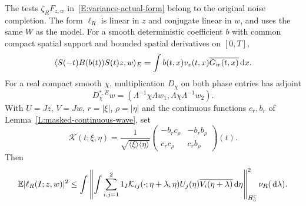 \begin{proposition}\label{P:actual-wave-form}
  The tests $\zeta_RF_{z,w}$ in~\eqref{E:variance-actual-form} belong to the
  original noise completion. The form $\ell_R$ is linear in $z$ and conjugate
  linear in $w$, and uses the same $W$ as the model. For a smooth deterministic
  coefficient $b$ with common compact spatial support and bounded spatial
  derivatives on $[0,T]$,
  \begin{equation}\label{E:variance-physical-adjoint}
    \langle S(-t)B(b(t))S(t)z,w\rangle_E
    = \int b(t,x)v_z(t,x)\overline{G_w(t,x)}\,\mathrm{d} x.
  \end{equation}
  For a real compact smooth $\chi$, multiplication $D_\chi$ on both phase
  entries has adjoint
  \begin{equation}\label{E:variance-cutoff-adjoint}
    D_\chi^{*,E}w
    = \left(\Lambda^{-1}\chi\Lambda w_1,
    \Lambda\chi\Lambda^{-1}w_2\right).
  \end{equation}
  With $U = Jz$, $V = Jw$, $r = |\xi|$, $\rho = |\eta|$ and the continuous
  functions $c_r,b_r$ of Lemma~\ref{L:masked-continuous-wave}, set
  \begin{equation}\label{E:variance-normalized-kernel}
    \mathcal{K}(t;\xi,\eta)
    = \frac1{\sqrt{\langle\xi\rangle\langle\eta\rangle}}
    \begin{pmatrix}
      -b_rc_\rho & -b_rb_\rho\\
      c_rc_\rho & c_rb_\rho
    \end{pmatrix}(t).
  \end{equation}
  Then
  \begin{equation}\label{E:variance-normalized-covariance}
    \mathbb{E}|\ell_R(I;z,w)|^2
    \le \int\left\|\int\sum_{i,j=1}^2
    1_I\mathcal{K}_{ij}(\cdot;\eta+\lambda,\eta)
    U_j(\eta)\overline{V_i(\eta+\lambda)}\,\mathrm{d}\eta
    \right\|_{H_a^{\mathbb{C}}}^2\nu_R(\,\mathrm{d}\lambda).
  \end{equation}
\end{proposition}

